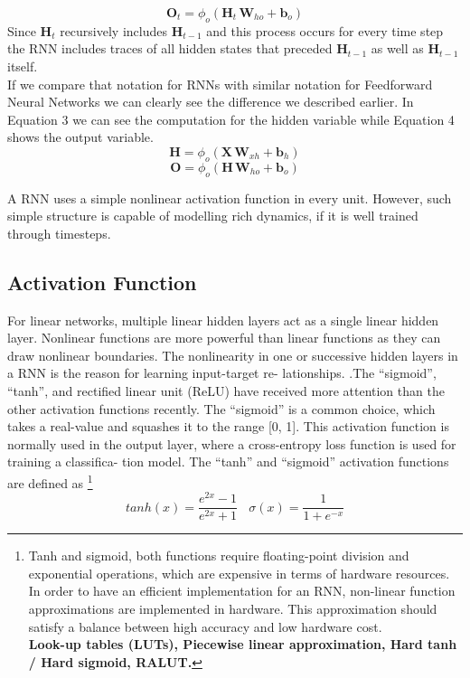 \documentclass{article}
\begin{document}
\begin{equation}
  \mathbf{O}_t = \phi_o (\mathbf{H}_t\,\mathbf{W}_{ho} + \mathbf{b}_o)
\end{equation}
Since $\mathbf{H}_t$ recursively includes $\mathbf{H}_{t-1}$ and this process occurs for every time step the RNN includes
traces of all hidden states that preceded $\mathbf{H}_{t-1}$ as well as $\mathbf{H}_{t-1}$ itself. \\

If we compare that notation for RNNs with similar notation for Feedforward Neural Networks we
can clearly see the difference we described earlier. In Equation 3 we can see the computation for the
hidden variable while Equation 4 shows the output variable.
\begin{equation}
  \mathbf{H} = \phi_{o} (\mathbf{X}\,\mathbf{W}_{xh} + \mathbf{b}_h)
\end{equation}
\begin{equation}
  \mathbf{O} = \phi_{o} (\mathbf{H}\,\mathbf{W}_{ho} + \mathbf{b}_o)
\end{equation}

A RNN uses a simple nonlinear activation function in every unit. However, such
simple structure is capable of modelling rich dynamics, if it
is well trained through timesteps.
\subsection{Activation Function}
For linear networks, multiple linear hidden layers act as a
single linear hidden layer. Nonlinear functions are more
powerful than linear functions as they can draw nonlinear
boundaries. The nonlinearity in one or successive hidden
layers in a RNN is the reason for learning input-target re-
lationships.
.The “sigmoid”, “tanh”, and rectified linear unit
(ReLU) have received more attention than the other activation
functions recently. The “sigmoid” is a common choice, which
takes a real-value and squashes it to the range [0, 1]. This
activation function is normally used in the output layer, where
a cross-entropy loss function is used for training a classifica-
tion model. The “tanh” and “sigmoid” activation functions are
defined as
\footnote{Tanh and sigmoid, both functions
require floating-point division and exponential operations,
which are expensive in terms of hardware resources. In order
to have an efficient implementation for an RNN, non-linear
function approximations are implemented in hardware. This
approximation should satisfy a balance between high accuracy and low hardware cost. \\
\textbf{Look-up tables (LUTs), Piecewise linear approximation, Hard tanh / Hard sigmoid, RALUT.}}
\begin{equation}
  tanh(x) = \frac{e^{2x} - 1}{e^{2x} + 1} \:\:\:\:
  \sigma (x) = \frac{1}{1 + e^{-x}}
\end{equation}
\end{document}
